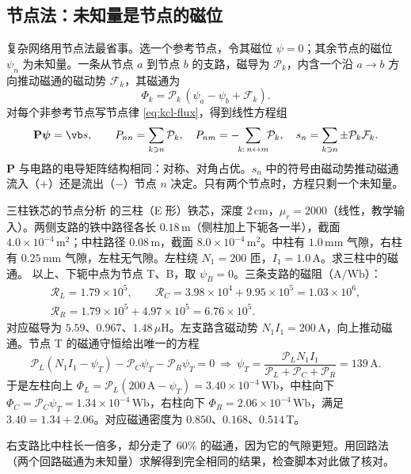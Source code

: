 \subsection{节点法：未知量是节点的磁位}
复杂网络用节点法最省事。选一个参考节点，令其磁位 $\psi=0$；其余节点的磁位 $\psi_n$ 为未知量。一条从节点 $a$ 到节点 $b$ 的支路，磁导为 $\mathcal P_k$，内含一个沿 $a\to b$ 方向推动磁通的磁动势 $\mathcal F_k$，其磁通为
\begin{equation}
\Phi_k=\mathcal P_k\,(\psi_a-\psi_b+\mathcal F_k).
\end{equation}
对每个非参考节点写节点律 \eqref{eq:kcl-flux}，得到线性方程组
\begin{equation}
\mathbf P\boldsymbol\psi=\vb s,\qquad
P_{nn}=\sum_{k\ni n}\mathcal P_k,\quad P_{nm}=-\!\!\sum_{k:\,n\leftrightarrow m}\!\!\mathcal P_k,\quad
s_n=\sum_{k\ni n}\pm\mathcal P_k\mathcal F_k .
\label{eq:lumped-nodal}
\end{equation}
$\mathbf P$ 与电路的电导矩阵结构相同：对称、对角占优。$s_n$ 中的符号由磁动势推动磁通流入（$+$）还是流出（$-$）节点 $n$ 决定。只有两个节点时，方程只剩一个未知量。

\begin{example}[label=ex:lumped-ecore]{三柱铁芯的节点分析}
 的三柱（E 形）铁芯，深度 $2\,\mathrm{cm}$，$\mu_r=2000$（线性，教学输入）。两侧支路的铁中路径各长 $0.18\,\mathrm m$（侧柱加上下轭各一半），截面 $4.0\times10^{-4}\,\mathrm{m^2}$；中柱路径 $0.08\,\mathrm m$，截面 $8.0\times10^{-4}\,\mathrm{m^2}$。中柱有 $1.0\,\mathrm{mm}$ 气隙，右柱有 $0.25\,\mathrm{mm}$ 气隙，左柱无气隙。左柱绕 $N_1=200$ 匝，$I_1=1.0\,\mathrm A$。求三柱中的磁通。
\solution
以上、下轭中点为节点 T、B，取 $\psi_B=0$。三条支路的磁阻（$\mathrm{A/Wb}$）：
\begin{gather*}
\mathcal R_L=1.79\times10^5,\qquad
\mathcal R_C=3.98\times10^4+9.95\times10^5=1.03\times10^6,\\
\mathcal R_R=1.79\times10^5+4.97\times10^5=6.76\times10^5 .
\end{gather*}
对应磁导为 $5.59$、$0.967$、$1.48\,\mu\mathrm H$。左支路含磁动势 $N_1I_1=200\,\mathrm A$，向上推动磁通。节点 T 的磁通守恒给出唯一的方程
\begin{equation*}
\mathcal P_L(N_1I_1-\psi_T)-\mathcal P_C\psi_T-\mathcal P_R\psi_T=0
\ \Longrightarrow\
\psi_T=\frac{\mathcal P_LN_1I_1}{\mathcal P_L+\mathcal P_C+\mathcal P_R}=139\,\mathrm A .
\end{equation*}
于是左柱向上 $\Phi_L=\mathcal P_L(200\,\mathrm A-\psi_T)=3.40\times10^{-4}\,\mathrm{Wb}$，中柱向下 $\Phi_C=\mathcal P_C\psi_T=1.34\times10^{-4}\,\mathrm{Wb}$，右柱向下 $\Phi_R=2.06\times10^{-4}\,\mathrm{Wb}$，满足 $3.40=1.34+2.06$。对应磁通密度为 $0.850$、$0.168$、$0.514\,\mathrm T$。

右支路比中柱长一倍多，却分走了 $60\%$ 的磁通，因为它的气隙更短。用回路法（两个回路磁通为未知量）求解得到完全相同的结果，检查脚本对此做了核对。
\end{example}

